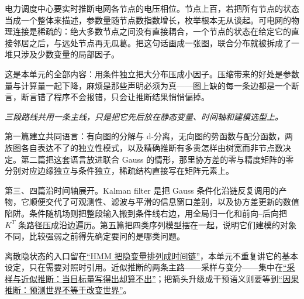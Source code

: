 电力调度中心要实时推断电网各节点的电压相位。节点上百，若把所有节点的状态当成一个整体来描述，参数量随节点数指数增长，枚举根本无从谈起。可电网的物理连接是稀疏的：绝大多数节点之间没有直接耦合，一个节点的状态在给定它的直接邻居之后，与远处节点再无瓜葛。把这句话画成一张图，联合分布就被拆成了一堆只涉及少数变量的局部因子。

这是本单元的全部内容：用条件独立把大分布压成小因子。压缩带来的好处是参数量与计算量一起下降，麻烦是那些声明必须为真——图上缺的每一条边都是一个断言，断言错了程序不会报错，只会让推断结果悄悄偏掉。

\begin{center}
\end{center}

\emph{三段路线共用一条主线，只是把它先后放在静态变量、时间轴和建模选型上。}

第一篇建立共同语言：有向图的分解与 d-分离，无向图的势函数与配分函数，两族图各自表达不了的独立性模式，以及精确推断有多贵怎样由树宽而非节点数决定。第二篇把这套语言放进联合 Gauss 的情形，那里协方差的零与精度矩阵的零分别对应边缘独立与条件独立，稀疏结构直接写在矩阵元素上。

第三、四篇沿时间轴展开。Kalman filter 是把 Gauss 条件化沿链反复调用的产物，它顺便交代了可观测性、滤波与平滑的信息窗口差别，以及协方差更新的数值陷阱。条件随机场则把整段输入搬到条件线右边，用全局归一化和前向--后向把 \(K^{T}\) 条路径压成沿边遍历。第五篇把四类序列模型摆在一起，说明它们建模的对象不同，比较强弱之前得先确定要问的是哪类问题。

离散隐状态的入口留在\hyperref[sec:13-Machine-Learning/06-Probabilistic-Models/05]{``HMM 把隐变量排列成时间链''}，本单元不重复讲它的基本设定，只在需要对照时引用。近似推断的两条主路——采样与变分——集中在\hyperref[ch:116]{``采样与近似推断：当目标量写得出却算不出''}；把箭头升级成干预语义则要等到\hyperref[ch:120]{``因果推断：预测世界不等于改变世界''}。

